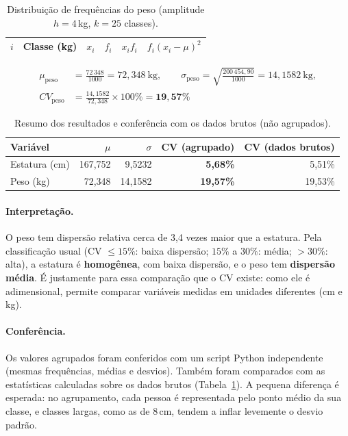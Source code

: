 \documentclass[11pt,a4paper]{article}
\begin{document}
\begin{table}[H]
\centering
\footnotesize
\renewcommand{\arraystretch}{0.92}
\caption{Distribuição de frequências do peso (amplitude $h = 4$\,kg, $k = 25$ classes).}
\begin{tabular}{@{}clrrrr@{}}
\toprule
$i$ & Classe (kg) & $x_i$ & $f_i$ & $x_i f_i$ & $f_i (x_i - \mu)^2$ \\
\midrule

\end{tabular}
\end{table}

\begin{align*}
\mu_{\text{peso}} &= \frac{72\,348}{1000} = 72{,}348\ \text{kg}, \qquad
\sigma_{\text{peso}} = \sqrt{\frac{200\,454{,}90}{1000}} = 14{,}1582\ \text{kg},\\
CV_{\text{peso}} &= \frac{14{,}1582}{72{,}348}\times 100\% = \mathbf{19{,}57\%}
\end{align*}


\begin{table}[H]
\centering
\small
\caption{Resumo dos resultados e conferência com os dados brutos (não agrupados).}
\label{tab:resumo}
\begin{tabular}{@{}lrrrr@{}}
\toprule
Variável & $\mu$ & $\sigma$ & \textbf{CV (agrupado)} & CV (dados brutos) \\
\midrule
Estatura (cm) & 167,752 & 9,5232 & \textbf{5,68\%} & 5,51\% \\
Peso (kg)     & 72,348  & 14,1582 & \textbf{19,57\%} & 19,53\% \\
\bottomrule
\end{tabular}
\end{table}

\paragraph{Interpretação.} O peso tem dispersão relativa cerca de 3,4 vezes maior que a estatura. Pela
classificação usual (CV $\le 15\%$: baixa dispersão; $15\%$ a $30\%$: média; $> 30\%$: alta), a estatura é
\textbf{homogênea}, com baixa dispersão, e o peso tem \textbf{dispersão média}. É justamente para essa comparação
que o CV existe: como ele é adimensional, permite comparar variáveis medidas em unidades diferentes (cm e kg).

\paragraph{Conferência.} Os valores agrupados foram conferidos com um script Python independente (mesmas
frequências, médias e desvios). Também foram comparados com as estatísticas calculadas sobre os dados brutos
(Tabela~\ref{tab:resumo}). A pequena diferença é esperada: no agrupamento, cada pessoa é representada pelo
ponto médio da sua classe, e classes largas, como as de 8\,cm, tendem a inflar levemente o desvio padrão.
\end{document}

